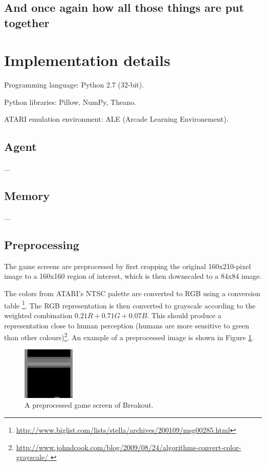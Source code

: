 \documentclass[a4paper,12pt]{article}
\begin{document}
\subsection{And once again how all those things are put together}



%
%
\pagebreak
\section{Implementation details}
Programming language: Python 2.7 (32-bit).

Python libraries: Pillow, NumPy, Theano.

ATARI emulation environment: ALE (Arcade Learning Environement).

\subsection{Agent}
...

\subsection{Memory}
...

\subsection{Preprocessing}
\label{subsection_preproc}
The game screens are preprocessed by first cropping the original 160x210-pixel image to a 160x160 region of interest, which is then downscaled to a 84x84 image.

The colors from ATARI's NTSC palette are converted to RGB using a conversion table
\footnote{\url{http://www.biglist.com/lists/stella/archives/200109/msg00285.html}}. The RGB representation is then converted to grayscale according to the weighted combination $0.21R + 0.71G + 0.07B$. This should produce a representation close to human perception (humans are more sensitive to green than other colours)\footnote{\url{http://www.johndcook.com/blog/2009/08/24/algorithms-convert-color-grayscale/
}}. An example of a preprocessed image is shown in Figure \ref{fig:breakoutpreprocessed}.

\begin{figure}[h]
\centering
\includegraphics[width=2.5cm]{fig_preprocessedscreen}
\caption{A preprocessed game screen of Breakout.}
\label{fig:breakoutpreprocessed}
\end{figure}
\end{document}
